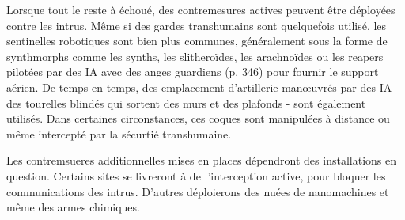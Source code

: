 Lorsque tout le reste à échoué, des contremesures actives peuvent être déployées contre les intrus. Même si des gardes transhumains sont quelquefois utilisé, les sentinelles robotiques sont bien plus communes, généralement sous la forme de synthmorphs comme les synths, les slitheroïdes, les arachnoïdes ou les reapers pilotées par des IA avec des anges guardiens (p. 346) pour fournir le support aérien. De temps en temps, des emplacement d'artillerie manœuvrés par des IA - des tourelles blindés qui sortent des murs et des plafonds - sont également utilisés. Dans certaines circonstances, ces coques sont manipulées à distance ou même intercepté par la sécurtié transhumaine. 

Les contremsueres additionnelles mises en places dépendront des installations en question. Certains sites se livreront à de l'interception active, pour bloquer les communications des intrus. D'autres déploierons des nuées de nanomachines et même des armes chimiques. 